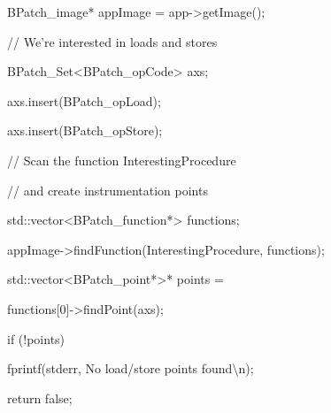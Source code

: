 {{{

BPatch_image* appImage = app->getImage();}





\bigskip



{

// We're interested in loads and stores}



{

BPatch_Set<BPatch_opCode> axs;}



{

axs.insert(BPatch_opLoad);}



{

axs.insert(BPatch_opStore);}





\bigskip



{

// Scan the function InterestingProcedure



{

// and create instrumentation points}



{

std::vector<BPatch_function*> functions;}



{

appImage->findFunction({\textquotedbl}InterestingProcedure{\textquotedbl}, functions);}



{

std::vector<BPatch_point*>* points =



{

functions[0]->findPoint(axs);}



{

if (!points) {}



{

fprintf(stderr, {\textquotedbl}No load/store points found{\textbackslash}n{\textquotedbl});}



{

return false;}



}}}}}
